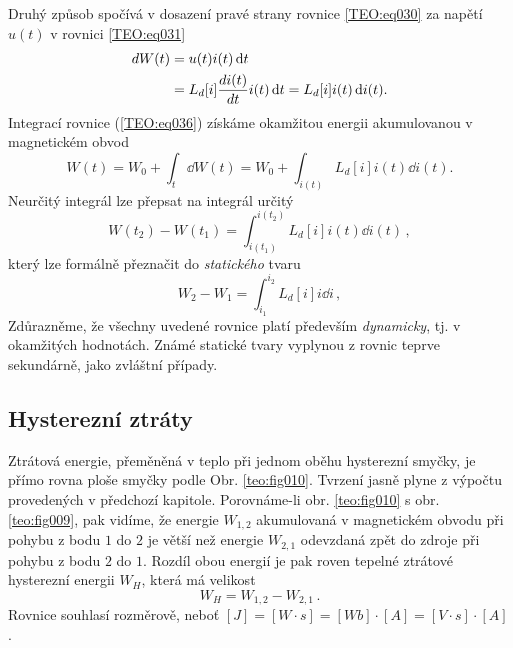 {      Druhý způsob spočívá v dosazení pravé strany rovnice \ref{TEO:eq030} za napětí \(u(t)\) v 
      rovnici \ref{TEO:eq031}
      \begin{align}\label{TEO:eq036}
        dW(t) &= u(t)i(t)\mathop{}\!\mathrm{d}t                            \nonumber \\
              &= L_d[i]\dfrac{d i(t)}{d t}i(t)\mathop{}\!\mathrm{d}t = L_d[i]i(t)\mathop{}\!\mathrm{d}i(t).
      \end{align}
      Integrací rovnice (\ref{TEO:eq036}) získáme okamžitou energii akumulovanou v magnetickém obvod
      \begin{equation}\label{TEO:eq037}
        W(t) = W_0 + \int_t\dd{W(t)} = W_0 + \int_{i(t)} L_d[i]i(t)\dd{i(t)}.
      \end{equation}
      Neurčitý integrál lze přepsat na integrál určitý
      \begin{equation}\label{TEO:eq038}
        \boxed{W(t_2) - W(t_1)  = \int_{i(t_1)}^{i(t_2)} L_d[i]i(t)\dd{i(t)}}\,,
      \end{equation}
      který lze formálně přeznačit do \emph{statického} tvaru
      \begin{equation}\label{TEO:eq039}
        \boxed{W_2 - W_1 = \int_{i_1}^{i_2} L_d[i]i\dd{i}}\,,
      \end{equation}
      Zdůrazněme, že všechny uvedené rovnice platí především \emph{dynamicky}, tj. v okamžitých 
      hodnotách. Známé statické tvary vyplynou z rovnic teprve sekundárně, jako zvláštní případy. 
      
    \subsection{Hysterezní ztráty}
      Ztrátová energie, přeměněná v teplo při jednom oběhu hysterezní smyčky, je přímo rovna ploše 
      smyčky podle Obr. \ref{teo:fig010}. Tvrzení jasně plyne z výpočtu provedených v předchozí 
      kapitole. Porovnáme-li obr. \ref{teo:fig010} s obr. \ref{teo:fig009}, pak vidíme, že energie 
      \(W_{1,2}\) akumulovaná v magnetickém obvodu při pohybu z bodu \(1\) do \(2\) je větší než 
      energie \(W_{2,1}\) odevzdaná zpět do zdroje při pohybu z bodu \(2\) do \(1\). Rozdíl obou 
      energií je pak roven tepelné ztrátové hysterezní energii \(W_H\), která má velikost
      \begin{equation}\label{TEO:eq040}
        W_H = W_{1,2} - W_{2,1}\,.
      \end{equation}
      Rovnice souhlasí rozměrově, neboť \([J] = [W\cdot s] = [Wb]\cdot[A] = [V\cdot s]\cdot[A]\).
      
}

